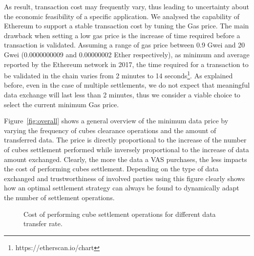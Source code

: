 As result, transaction cost may frequently vary, thus leading to uncertainty about the economic feasibility of a specific application. We analysed the capability of Ethereum to support a stable transaction cost by tuning the Gas price. The main drawback when setting a low gas price is the increase of time required before a transaction is validated. Assuming a range of gas price between 0.9 Gwei and 20 Gwei (0.0000000009 and 0.00000002 Ether respectively), as minimum and average reported by the Ethereum network in 2017, the time required for a transaction to be validated in the chain varies from 2 minutes to 14 seconds\footnote{https://etherscan.io/chart}. As explained before, even in the case of multiple settlements, we do not expect that meaningful data exchange will last less than 2 minutes, thus we consider a viable choice to select the current minimum Gas price.


Figure~\ref{fig:overall} shows a general overview of the minimum data price by varying the frequency of cubes clearance operations and the amount of transferred data. The price is directly proportional to the increase of the number of cubes settlement performed while inversely proportional to the increase of data amount exchanged. Clearly, the more the data a VAS purchases, the less impacts the cost of performing cubes settlement. Depending on the type of data exchanged and trustworthiness of involved parties using this figure clearly shows how an optimal settlement strategy can always be found to dynamically adapt the number of settlement operations.

\begin{figure}[t]
	\centering
	\caption{Cost of performing cube settlement operations for different data transfer rate.}
	\label{fig:all}
\end{figure}

